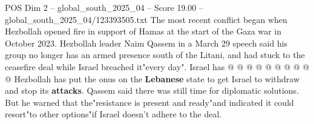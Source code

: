 \begin{textsample}{POS Dim 2 – global\_south\_2025\_04 – Score 19.00 – global\_south\_2025\_04/123393505.txt}
The most recent conflict began when Hezbollah opened fire in support of Hamas at the start of the Gaza war in October 2023.
Hezbollah leader Naim Qassem in a March 29 speech said his group no longer has an armed presence south of the Litani, and had stuck to the ceasefire deal while Israel breached it"every day".
Israel has @ @ @ @ @ @ @ @ @ @ Hezbollah has put the onus on the \textbf{Lebanese} state to get Israel to withdraw and stop its \textbf{attacks}.
Qassem said there was still time for diplomatic solutions.
But he warned that the"resistance is present and ready"and indicated it could resort"to other options"if Israel doesn't adhere to the deal.

\end{textsample}
